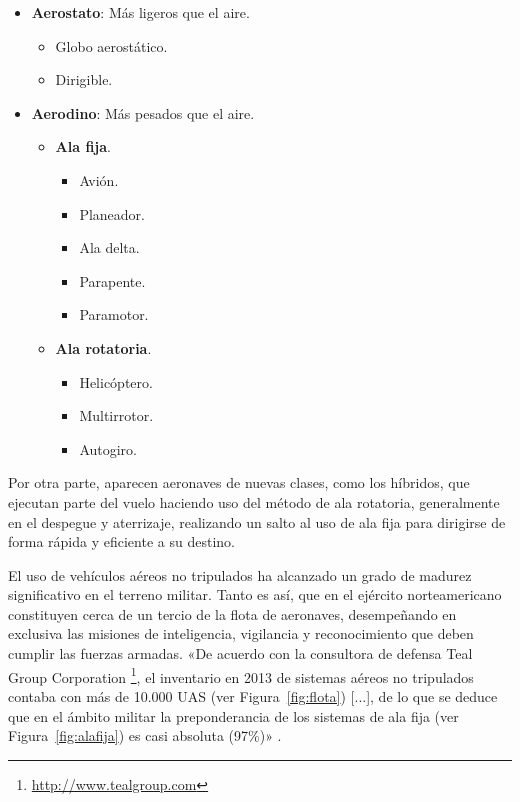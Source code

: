 \begin{itemize}
\item \textbf{Aerostato}: Más ligeros que el aire.
	\begin{itemize}
	\item Globo aerostático.
	\item Dirigible.
	\end{itemize}
\item \textbf{Aerodino}: Más pesados que el aire.
	\begin{itemize}
	\item \textbf{Ala fija}.
		\begin{itemize}
		\item Avión.
		\item Planeador.
		\item Ala delta.
		\item Parapente.
		\item Paramotor.
		\end{itemize}
	\item \textbf{Ala rotatoria}.
		\begin{itemize}
		\item Helicóptero.
		\item Multirrotor.
		\item Autogiro.
		\end{itemize}
	\end{itemize}
\end{itemize}

Por otra parte, aparecen aeronaves de nuevas clases, como los híbridos, que ejecutan parte del vuelo haciendo uso del método de ala rotatoria, generalmente en el despegue y aterrizaje, realizando un salto al uso de ala fija para dirigirse de forma rápida y eficiente a su destino.

El uso de vehículos aéreos no tripulados ha alcanzado un grado de madurez significativo en el terreno militar. Tanto es así, que 
en el ejército norteamericano constituyen cerca de un tercio de la flota de aeronaves, desempeñando en exclusiva las misiones 
de inteligencia, vigilancia y reconocimiento que deben cumplir las fuerzas armadas. «De acuerdo con la consultora de defensa Teal Group Corporation \footnote{\url{http://www.tealgroup.com}}, el inventario en 2013 de sistemas aéreos no tripulados contaba con más de 10.000 \acs{UAS} (ver Figura~\ref{fig:flota}) [...], de lo que se deduce que en el ámbito militar la preponderancia de los sistemas de ala fija (ver Figura~\ref{fig:alafija}) es casi absoluta (97\%)» \cite{dron2}.


